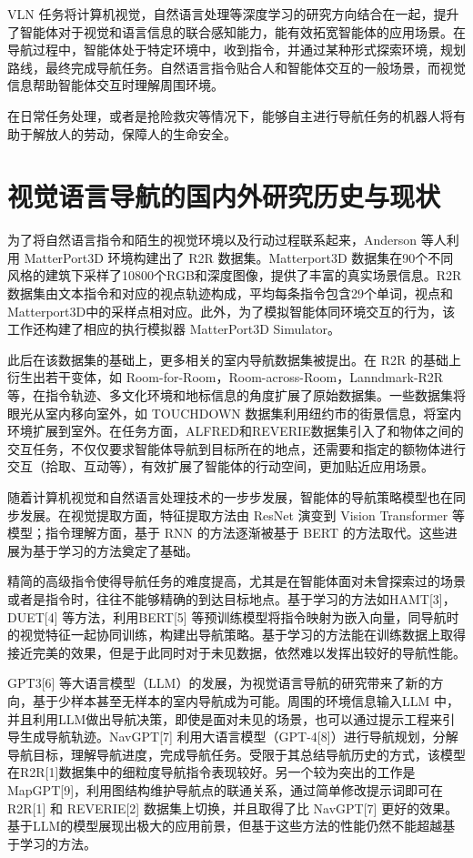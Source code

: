 \documentclass[bachelor]{thesis-uestc}
\begin{document}
VLN 任务将计算机视觉，自然语言处理等深度学习的研究方向结合在一起，提升了智能体对于视觉和语言信息的联合感知能力，能有效拓宽智能体的应用场景。在导航过程中，智能体处于特定环境中，收到指令，并通过某种形式探索环境，规划路线，最终完成导航任务。自然语言指令贴合人和智能体交互的一般场景，而视觉信息帮助智能体交互时理解周围环境。

在日常任务处理，或者是抢险救灾等情况下，能够自主进行导航任务的机器人将有助于解放人的劳动，保障人的生命安全。


\section{视觉语言导航的国内外研究历史与现状}
为了将自然语言指令和陌生的视觉环境以及行动过程联系起来，Anderson 等人\cite{andersonVisionandLanguageNavigationInterpreting2018}利用 MatterPort3D 环境构建出了 R2R 数据集。Matterport3D 数据集在90个不同风格的建筑下采样了10800个RGB和深度图像，提供了丰富的真实场景信息。R2R 数据集由文本指令和对应的视点轨迹构成，平均每条指令包含29个单词，视点和Matterport3D中的采样点相对应。此外，为了模拟智能体同环境交互的行为，该工作还构建了相应的执行模拟器 MatterPort3D Simulator。

此后在该数据集的基础上，更多相关的室内导航数据集被提出。在 R2R 的基础上衍生出若干变体，如 Room-for-Room，Room-across-Room，Lanndmark-R2R等，在指令轨迹、多文化环境和地标信息的角度扩展了原始数据集。一些数据集将眼光从室内移向室外，如 TOUCHDOWN 数据集利用纽约市的街景信息，将室内环境扩展到室外。在任务方面，ALFRED和REVERIE数据集引入了和物体之间的交互任务，不仅仅要求智能体导航到目标所在的地点，还需要和指定的额物体进行交互（拾取、互动等），有效扩展了智能体的行动空间，更加贴近应用场景。

随着计算机视觉和自然语言处理技术的一步步发展，智能体的导航策略模型也在同步发展。在视觉提取方面，特征提取方法由 ResNet 演变到 Vision Transformer 等模型；指令理解方面，基于 RNN 的方法逐渐被基于 BERT 的方法取代。这些进展为基于学习的方法奠定了基础。

精简的高级指令使得导航任务的难度提高，尤其是在智能体面对未曾探索过的场景或者是指令时，往往不能够精确的到达目标地点。基于学习的方法如HAMT[3]，DUET[4] 等方法，利用BERT[5] 等预训练模型将指令映射为嵌入向量，同导航时的视觉特征一起协同训练，构建出导航策略。基于学习的方法能在训练数据上取得接近完美的效果，但是于此同时对于未见数据，依然难以发挥出较好的导航性能。

GPT3[6] 等大语言模型（LLM）的发展，为视觉语言导航的研究带来了新的方向，基于少样本甚至无样本的室内导航成为可能。周围的环境信息输入LLM 中，并且利用LLM做出导航决策，即使是面对未见的场景，也可以通过提示工程来引导生成导航轨迹。NavGPT[7] 利用大语言模型（GPT-4[8]）进行导航规划，分解导航目标，理解导航进度，完成导航任务。受限于其总结导航历史的方式，该模型在R2R[1]数据集中的细粒度导航指令表现较好。另一个较为突出的工作是 MapGPT[9]，利用图结构维护导航点的联通关系，通过简单修改提示词即可在R2R[1] 和 REVERIE[2] 数据集上切换，并且取得了比 NavGPT[7] 更好的效果。基于LLM的模型展现出极大的应用前景，但基于这些方法的性能仍然不能超越基于学习的方法。
\end{document}
